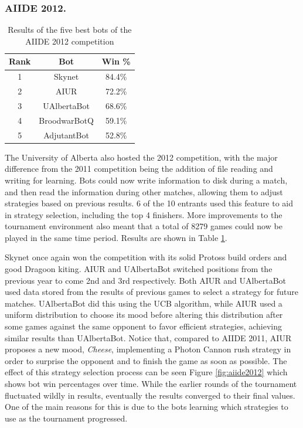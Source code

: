 \documentclass{llncs}
\begin{document}
\subsubsection{AIIDE 2012.}

\begin{table}[!t]
\caption{Results of the five best bots of the AIIDE 2012 competition}
\label{tab:aiide2012}
\centering
\begin{tabular}{|c|c|c|}
\hline
{\bfseries Rank} & {\bfseries Bot} & {\bfseries Win \%} \\
\hline
1 & Skynet & 84.4\% \\
2 & AIUR & 72.2\% \\
3 & UAlbertaBot & 68.6\% \\
4 & BroodwarBotQ & 59.1\% \\
5 & AdjutantBot & 52.8\% \\
\hline
\end{tabular}
\end{table}

The University of Alberta also hosted the 2012 competition, with the major difference from the 2011
competition being the addition of file reading and writing for learning. Bots could now write information to disk during a
match, and then read the information during other matches, allowing them to adjust strategies based
on previous results. 6 of the 10 entrants used this feature to aid in strategy selection, including the
top 4 finishers. More improvements to the tournament environment also meant that a total of 8279 games
could now be played in the same time period. Results are shown in Table \ref{tab:aiide2012}.

Skynet once  again won  the competition with  its solid  Protoss build
orders  and  good  Dragoon  kiting.   AIUR  and  UAlbertaBot  switched
positions from  the previous  year to come  2nd and  3rd respectively.
Both  AIUR  and UAlbertaBot  used  data  stored  from the  results  of
previous games  to select a strategy for  future matches.  UAlbertaBot
did  this  using  the  UCB  \cite{auer2002finite} algorithm,  while  AIUR  used  a  uniform
distribution  to choose  its  mood before  altering this  distribution
after  some  games  against  the  same  opponent  to  favor  efficient
strategies, achieving  similar results than  UAlbertaBot. Notice that,
compared  to AIIDE 2011,  AIUR proposes  a new  mood, \textit{Cheese},
implementing a  Photon Cannon rush  strategy in order to  surprise the
opponent and  to finish the game  as soon as possible.   The effect of
this strategy selection process can be seen Figure \ref{fig:aiide2012}
which shows bot  win percentages over time.  While  the earlier rounds
of the tournament fluctuated wildly in results, eventually the results
converged to their  final values. One of the main  reasons for this is
due to  the bots  learning which strategies  to use as  the tournament
progressed.
\end{document}
